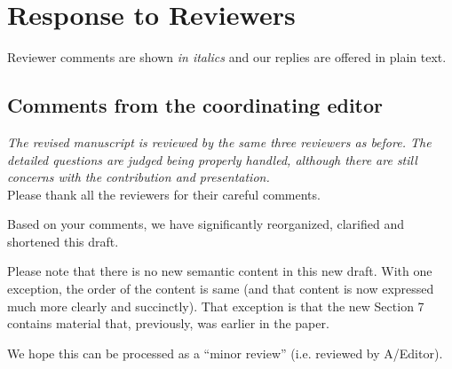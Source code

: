\documentclass{svjour3}
\theoremstyle{break}
\newcommand{\review}[1]{{\textit{#1}}~\\}
\begin{document}
\section*{Response to Reviewers}

Reviewer comments are shown {\em in italics} and our replies
are offered in plain text.

\subsection*{Comments from the coordinating editor}

\review{The revised manuscript is reviewed by the same three reviewers as before. The detailed questions are judged being properly handled, although there are still concerns with the contribution and presentation. }


Please thank all the reviewers for their careful comments. 

Based on your comments, we have significantly reorganized, clarified and shortened this draft.

Please note that there is no new semantic content in this new draft. With one exception, the order of the content is same  (and that content is now expressed much more clearly and succinctly). That exception is that the new Section 7 contains material that, previously, was earlier in the paper.

We hope this can be processed  as a “minor review” (i.e. reviewed by A/Editor).
\end{document}
